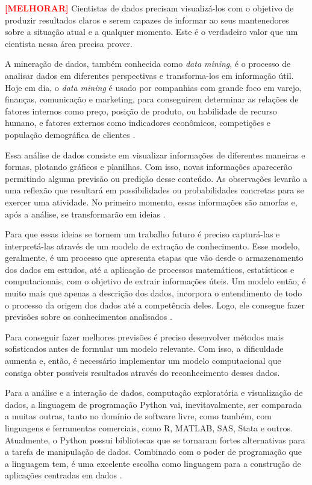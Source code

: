 \textbf{\textcolor{red}{[MELHORAR]}} Cientistas de dados precisam visualizá-los com o objetivo de produzir resultados claros e serem capazes de informar ao seus mantenedores sobre a situação atual e a qualquer momento. Este é o verdadeiro valor que um cientista nessa área precisa prover.

A mineração de dados, também conhecida como \textit{data mining}, é o processo de analisar dados em diferentes perspectivas e transforma-los em informação útil. Hoje em dia, o \textit{data mining} é usado por companhias com grande foco em varejo, finanças, comunicação e marketing, para conseguirem determinar as relações de fatores internos como preço, posição de produto, ou habilidade de recurso humano, e fatores externos como indicadores econômicos, competições e população demográfica de clientes \cite{mining-social-web}.

Essa análise de dados consiste em visualizar informações de diferentes maneiras e formas, plotando gráficos e planilhas. Com isso, novas informações aparecerão permitindo alguma previsão ou predição desse conteúdo. As observações levarão a uma reflexão que resultará em possibilidades ou probabilidades concretas para se exercer uma atividade. No primeiro momento, essas informações são amorfas e, após a análise, se transformarão em ideias \cite{han}.

Para que essas ideias se tornem um trabalho futuro é preciso capturá-las e interpretá-las através de um modelo de extração de conhecimento. Esse modelo, geralmente, é um processo que apresenta etapas que vão desde o armazenamento dos dados em estudos, até a aplicação de processos matemáticos, estatísticos e computacionais, com o objetivo de extrair informações úteis. Um modelo então, é muito mais que apenas a descrição dos dados, incorpora o entendimento de todo o processo da origem dos dados até a competência deles. Logo, ele consegue fazer previsões sobre os conhecimentos analisados \cite{han}.

Para conseguir fazer melhores previsões é preciso desenvolver métodos mais sofisticados antes de formular um modelo relevante. Com isso, a dificuldade aumenta e, então, é necessário implementar um modelo computacional que consiga obter possíveis resultados através do reconhecimento desses dados.

Para a análise e a interação de dados, computação exploratória e visualização de dados, a linguagem de programação Python vai, inevitavalmente, ser comparada a muitas outras, tanto no domínio de software livre, como também, com linguagens e ferramentas comerciais, como R, MATLAB, SAS, Stata e outros. Atualmente, o Python possui bibliotecas que se tornaram fortes alternativas para a tarefa de manipulação de dados. Combinado com o poder de programação que a linguagem tem, é uma excelente escolha como linguagem para a construção de aplicações centradas em dados \cite{python-analysis}.

